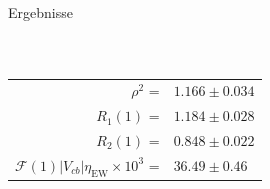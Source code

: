 \documentclass{beamer}
\begin{document}
\begin{frame}{Ergebnisse}
\begin{columns}
\begin{figure}[htbp]
\end{figure}  
\end{columns}
\centering
\small
\begin{tabular}{rl}
$\rho ^2$ = &	$1.166 \pm 0.034 $	\\
$R_1(1)$	 = & $1.184 \pm 0.028 $	 \\
$R_2(1)$		= &	$0.848 \pm 0.022$	 \\
$\mathcal{F} (1) |V_{cb}| \eta _{\text{EW}} \times 10^3$		= &	$36.49 \pm 0.46$	\\ 
\end{tabular} 

\end{frame}
\end{document}
